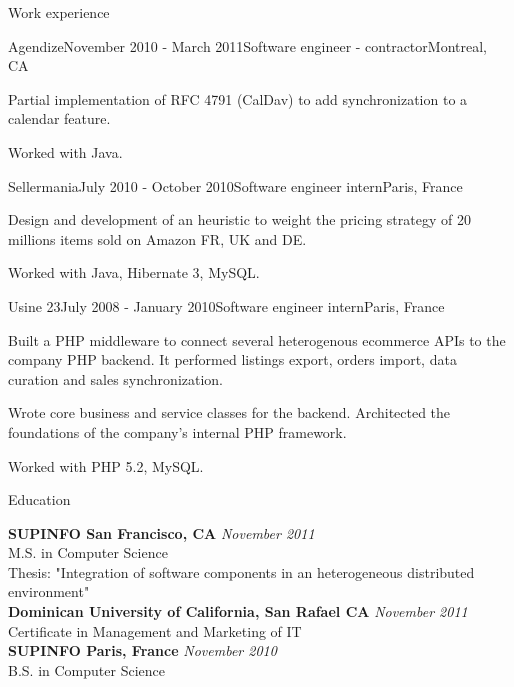 \documentclass{resume} %
\begin{document}
\begin{rSection}{Work experience}
\begin{rSubsection}{Agendize}{November 2010 - March 2011}{Software engineer - contractor}{Montreal, CA}
\item Partial implementation of RFC 4791 (CalDav) to add synchronization to a calendar feature.
\item Worked with Java.
\end{rSubsection}


\begin{rSubsection}{Sellermania}{July 2010 - October 2010}{Software engineer intern}{Paris, France}
\item Design and development of an heuristic to weight the pricing strategy of 20 millions items sold on Amazon FR, UK and DE.
\item Worked with Java, Hibernate 3, MySQL.
\end{rSubsection}

\begin{rSubsection}{Usine 23}{July 2008 - January 2010}{Software engineer intern}{Paris, France}
\item Built a PHP middleware to connect several heterogenous ecommerce APIs to the company PHP backend. It performed listings export, orders import, data curation and sales synchronization.
\item Wrote core business and service classes for the backend. Architected the foundations of the company's internal PHP framework.
\item Worked with PHP 5.2, MySQL.
\end{rSubsection}

\end{rSection}

\newpage

\begin{rSection}{Education}

{\bf SUPINFO San Francisco, CA} \hfill {\em November 2011} \\
M.S. in Computer Science \\
Thesis: "Integration of software components in an heterogeneous distributed environment" \\

{\bf Dominican University of California, San Rafael CA} \hfill {\em November 2011} \\
Certificate in Management and Marketing of IT \\

{\bf SUPINFO Paris, France} \hfill {\em November 2010} \\
B.S. in Computer Science \\

\end{rSection}
\end{document}
